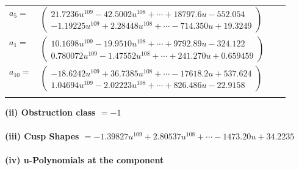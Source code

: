 \documentclass[1p]{elsarticle_modified}
\theoremstyle{definition}
\begin{document}
\begin{tabular}{m{7pt} m{180pt} m{7pt} m{180pt} }
\flushright $a_{5}=$&$\begin{pmatrix}21.7236 u^{109}-42.5002 u^{108}+\cdots+18797.6 u-552.054\\-1.19225 u^{109}+2.28448 u^{108}+\cdots-714.350 u+19.3249\end{pmatrix}$ \\
\flushright $a_{1}=$&$\begin{pmatrix}10.1698 u^{109}-19.9510 u^{108}+\cdots+9792.89 u-324.122\\0.780072 u^{109}-1.47552 u^{108}+\cdots+241.270 u+0.659459\end{pmatrix}$ \\
\flushright $a_{10}=$&$\begin{pmatrix}-18.6242 u^{109}+36.7385 u^{108}+\cdots-17618.2 u+537.624\\1.04694 u^{109}-2.02223 u^{108}+\cdots+826.486 u-22.9158\end{pmatrix}$\\&\end{tabular}
\flushleft \textbf{(ii) Obstruction class $= -1$}\\~\\
\flushleft \textbf{(iii) Cusp Shapes $= -1.39827 u^{109}+2.80537 u^{108}+\cdots-1473.20 u+34.2235$}\\~\\
\newpage\renewcommand{\arraystretch}{1}
\flushleft \textbf{(iv) u-Polynomials at the component}\newline \\
\end{document}
